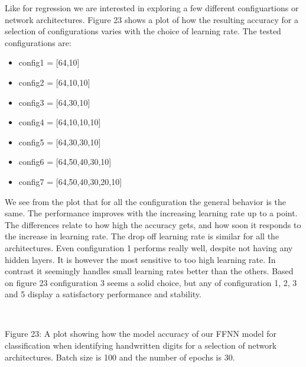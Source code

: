 \documentclass[11pt]{article}
\providecommand{\tightlist}{%
      \setlength{\itemsep}{0pt}\setlength{\parskip}{0pt}}
\begin{document}
    Like for regression we are interested in exploring a few different
configuartions or network architectures. Figure 23 shows a plot of how
the resulting accuracy for a selection of configurations varies with the
choice of learning rate. The tested configurations are:

\begin{itemize}
\tightlist
\item
  config1 = {[}64,10{]}
\item
  config2 = {[}64,10,10{]}
\item
  config3 = {[}64,30,10{]}
\item
  config4 = {[}64,10,10,10{]}
\item
  config5 = {[}64,30,30,10{]}
\item
  config6 = {[}64,50,40,30,10{]}
\item
  config7 = {[}64,50,40,30,20,10{]}
\end{itemize}

We see from the plot that for all the configuration the general behavior
is the same. The performance improves with the increasing learning rate
up to a point. The differences relate to how high the accuracy gets, and
how soon it responds to the increase in learning rate. The drop off
learning rate is similar for all the architectures. Even configuration 1
performs really well, despite not having any hidden layers. It is
however the most sensitive to too high learning rate. In contrast it
seemingly handles small learning rates better than the others. Based on
figure 23 configuration 3 seems a solid choice, but any of configuration 1, 2, 3
and 5 display a satisfactory performance and stability.


    \begin{center}
    \end{center}
    { \hspace*{\fill} \\}
    
    Figure 23: A plot showing how the model accuracy of our FFNN model for
classification when identifying handwritten digits for a selection of
network architectures. Batch size is 100 and the number of epochs is 30.


    \begin{center}
    \end{center}
    { \hspace*{\fill} \\}
    
\end{document}

